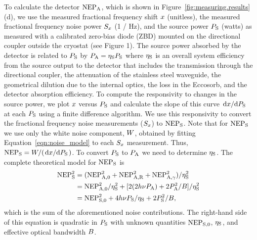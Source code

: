 To calculate the detector $\mathrm{NEP}_{\mathrm{A}}$, which is shown in Figure~\ref{fig:measuring.results}(d), we use the measured fractional frequency shift $x$ (unitless), the measured fractional frequency noise power $S_{x}$ (1 / Hz), and the source power $P_{\mathrm{S}}$ (watts) as measured with a calibrated zero-bias diode (ZBD) mounted on the directional coupler outside the cryostat (see Figure 1).
The source power absorbed by the detector is related to $P_{\mathrm{S}}$ by $P_{\mathrm{A}} = \eta_{\mathrm{S}} P_{\mathrm{S}}$ where $\eta_{\mathrm{S}}$ is an overall system efficiency from the source output to the detector that includes the transmission through the directional coupler, the attenuation of the stainless steel waveguide, the geometrical dilution due to the internal optics, the loss in the Eccosorb, and the detector absorption efficiency.
To compute the responsivity to changes in the source power, we plot $x$ versus $P_{\mathrm{S}}$ and calculate the slope of this curve $\dv*{x}{P_{\mathrm{S}}}$ at each $P_{\mathrm{S}}$ using a finite difference algorithm.
We use this responsivity to convert the fractional frequency noise measurements ($S_{x}$) to $\mathrm{NEP}_{\mathrm{S}}$.
Note that for $\mathrm{NEP}_{\mathrm{S}}$ we use only the white noise component, $W$, obtained by fitting Equation~\ref{eqn:noise_model} to each $S_{x}$ measurement.
Thus, $\mathrm{NEP}_{\mathrm{S}} = W / (\dv*{x}{P_{\mathrm{S}}})$.
To convert $P_{\mathrm{S}}$ to $P_{\mathrm{A}}$ we need to determine $\eta_{\mathrm{S}}$.
The complete theoretical model for $\mathrm{NEP}_{\mathrm{S}}$ is
\begin{align}
\begin{split}
\label{eqn:nep}
\mathrm{NEP}_{\mathrm{S}}^2
  &=
  (\mathrm{NEP}_{\mathrm{A}, 0}^2
   + \mathrm{NEP}_{\mathrm{A}, \mathrm{R}}^2
   + \mathrm{NEP}_{\mathrm{A}, \gamma}^2) / \eta_{\mathrm{S}}^2 \\
  &=
  \mathrm{NEP}_{\mathrm{A}, 0}^2 / \eta_{\mathrm{S}}^2
  + [2 (2 h \nu P_{\mathrm{A}}) + 2 P_{\mathrm{A}}^2 / B] / \eta_{\mathrm{S}}^2 \\
  &=
  \mathrm{NEP}_{\mathrm{S}, 0}^2
  + 4 h \nu P_{\mathrm{S}} / \eta_{\mathrm{S}}
  + 2 P_{\mathrm{S}}^2 / B,
\end{split}
\end{align}
which is the sum of the aforementioned noise contributions.
The right-hand side of this equation is quadratic in $P_{\mathrm{S}}$ with unknown quantities $\mathrm{NEP}_{\mathrm{S}, 0}$, $\eta_{\mathrm{S}}$, and effective optical bandwidth $B$.
